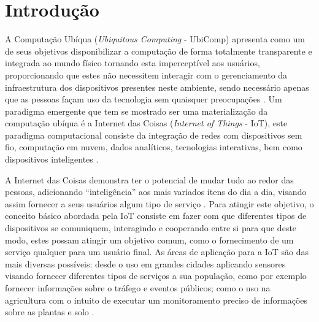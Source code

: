 \documentclass[ti,table]{texufpel} %
\begin{document}
  


\tableofcontents 

  



\chapter{Introdução} 

  

A Computação Ubíqua (\textit{Ubiquitous Computing} - UbiComp) apresenta como um de seus objetivos  disponibilizar a computação de forma totalmente transparente e integrada ao mundo físico tornando esta imperceptível aos usuários, proporcionando que estes não necessitem interagir com o gerenciamento da infraestrutura dos dispositivos presentes neste ambiente, sendo necessário apenas que as pessoas façam uso da tecnologia sem quaisquer preocupações \cite{weiser1999computer}. Um paradigma emergente que tem se mostrado ser uma materialização da computação ubíqua é a Internet das Coisas (\textit{Internet of Things} - IoT), este paradigma computacional consiste da integração de redes com dispositivos sem fio, computação em nuvem, dados analíticos, tecnologias interativas, bem como dispositivos inteligentes \cite{ashton2009internet}.  

  

A Internet das Coisas demonstra ter o potencial de mudar tudo ao redor das pessoas, adicionando ``inteligência'' aos mais variados itens do dia a dia, visando assim fornecer a seus usuários algum tipo de serviço \cite{bandyopadhyay2011internet}. Para atingir este objetivo, o conceito básico abordada pela IoT consiste em fazer com que diferentes tipos de dispositivos se comuniquem, interagindo e cooperando entre si para que deste modo, estes possam atingir um objetivo comum, como o fornecimento de um serviço qualquer para um usuário final. As áreas de aplicação para a IoT são das mais diversas possíveis: desde o uso em grandes cidades aplicando sensores visando fornecer diferentes tipos de serviços a sua população, como por exemplo fornecer informações sobre o tráfego e eventos públicos; como o uso na agricultura com o intuito de executar um monitoramento preciso de  informações sobre as plantas e solo \cite{gonccalves2017research}. 

  
\end{document}
